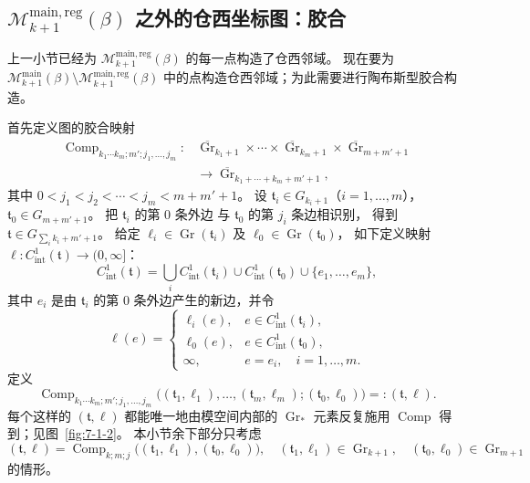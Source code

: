 
\subsection{$\mathcal M_{k+1}^{\mathrm{main,reg}}(\beta)$
之外的仓西坐标图：胶合}
\label{subsec:7-1-3}

上一小节已经为
$\mathcal M_{k+1}^{\mathrm{main,reg}}(\beta)$
的每一点构造了仓西邻域。
现在要为
$\mathcal M_{k+1}^{\mathrm{main}}(\beta)
\setminus\mathcal M_{k+1}^{\mathrm{main,reg}}(\beta)$
中的点构造仓西邻域；为此需要进行陶布斯型胶合构造。

首先定义图的胶合映射
\[
\begin{aligned}
\operatorname{Comp}_{k_1\cdots k_m;m';j_1,\ldots,j_m}\colon
&\overline{\operatorname{Gr}}_{k_1+1}\times\cdots\times
 \overline{\operatorname{Gr}}_{k_m+1}\times
 \overline{\operatorname{Gr}}_{m+m'+1}\\
&\longrightarrow
 \overline{\operatorname{Gr}}_{k_1+\cdots+k_m+m'+1},
\end{aligned}
\]
其中 $0<j_1<j_2<\cdots<j_m<m+m'+1$。
设 $\mathfrak t_i\in G_{k_i+1}$（$i=1,\ldots,m$），
$\mathfrak t_0\in G_{m+m'+1}$。
把 $\mathfrak t_i$ 的第 $0$ 条外边
与 $\mathfrak t_0$ 的第 $j_i$ 条边相识别，
得到 $\mathfrak t\in G_{\sum_i k_i+m'+1}$。
给定 $\ell_i\in\operatorname{Gr}(\mathfrak t_i)$
及 $\ell_0\in\operatorname{Gr}(\mathfrak t_0)$，
如下定义映射
$\ell\colon C^1_{\mathrm{int}}(\mathfrak t)\to(0,\infty]$：
\[
C^1_{\mathrm{int}}(\mathfrak t)
=\bigcup_i C^1_{\mathrm{int}}(\mathfrak t_i)
 \cup C^1_{\mathrm{int}}(\mathfrak t_0)
 \cup\{e_1,\ldots,e_m\},
\]
其中 $e_i$ 是由 $\mathfrak t_i$ 的第 $0$ 条外边产生的新边，并令
\[
\ell(e)=
\begin{cases}
\ell_i(e),&e\in C^1_{\mathrm{int}}(\mathfrak t_i),\\
\ell_0(e),&e\in C^1_{\mathrm{int}}(\mathfrak t_0),\\
\infty,&e=e_i,\quad i=1,\ldots,m.
\end{cases}
\]
定义
\[
\operatorname{Comp}_{k_1\cdots k_m;m';j_1,\ldots,j_m}
\bigl((\mathfrak t_1,\ell_1),\ldots,
(\mathfrak t_m,\ell_m);(\mathfrak t_0,\ell_0)\bigr)
=:(\mathfrak t,\ell).
\]
每个这样的 $(\mathfrak t,\ell)$
都能唯一地由模空间内部的
$\operatorname{Gr}_{*}$ 元素反复施用
$\operatorname{Comp}$ 得到；见图~\ref{fig:7-1-2}。
本小节余下部分只考虑
\[
(\mathfrak t,\ell)
=\operatorname{Comp}_{k;m;j}
  \bigl((\mathfrak t_1,\ell_1),(\mathfrak t_0,\ell_0)\bigr),
\quad
(\mathfrak t_1,\ell_1)\in\operatorname{Gr}_{k+1},\quad
(\mathfrak t_0,\ell_0)\in\operatorname{Gr}_{m+1}
\]
的情形。

